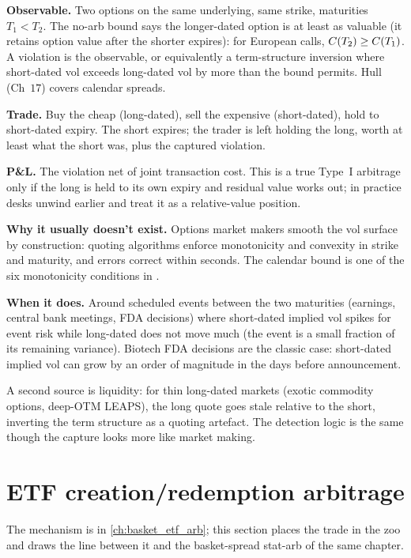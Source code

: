 \textbf{Observable.} Two options on the same underlying, same
strike, maturities $T_1 < T_2$. The no-arb bound says the
longer-dated option is at least as valuable (it retains option
value after the shorter expires): for European calls,
$C(T_2) \geq C(T_1)$. A violation is the observable, or
equivalently a term-structure inversion where short-dated vol
exceeds long-dated vol by more than the bound permits. Hull
\citeHull{} (Ch~$17$) covers calendar spreads.

\textbf{Trade.} Buy the cheap (long-dated), sell the expensive
(short-dated), hold to short-dated expiry. The short expires;
the trader is left holding the long, worth at least what the
short was, plus the captured violation.

\textbf{P\&L.} The violation net of joint transaction cost. This
is a true Type~I arbitrage only if the long is held to its own
expiry and residual value works out; in practice desks unwind
earlier and treat it as a relative-value position.

\textbf{Why it usually doesn't exist.} Options market makers
smooth the vol surface by construction: quoting algorithms
enforce monotonicity and convexity in strike and maturity, and
errors correct within seconds. The calendar bound is one of the
six monotonicity conditions in
\citep{damodaranOptionsArbitrage}.

\textbf{When it does.} Around scheduled events between the two
maturities (earnings, central bank meetings, FDA decisions)
where short-dated implied vol spikes for event risk while
long-dated does not move much (the event is a small fraction of
its remaining variance). Biotech FDA decisions are the classic
case: short-dated implied vol can grow by an order of magnitude
in the days before announcement.

A second source is liquidity: for thin long-dated markets
(exotic commodity options, deep-OTM LEAPS), the long quote goes
stale relative to the short, inverting the term structure as a
quoting artefact. The detection logic is the same though the
capture looks more like market making.

\section{ETF creation/redemption arbitrage}
\label{sec:ch13_etf_cr}

The mechanism is in \cref{ch:basket_etf_arb}; this section
places the trade in the zoo and draws the line between it and
the basket-spread stat-arb of the same chapter.

